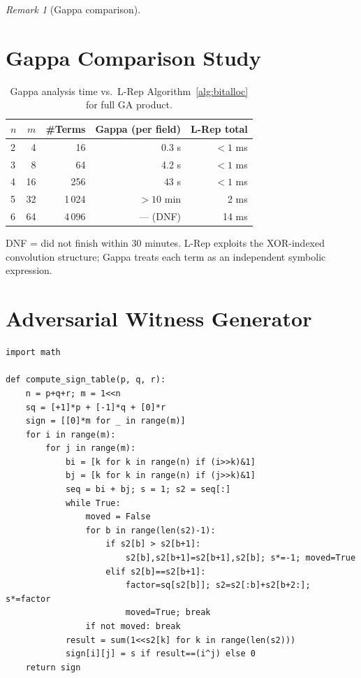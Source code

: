 \documentclass[11pt,a4paper]{article}
\theoremstyle{definition}
\theoremstyle{plain}
\theoremstyle{remark}
\newtheorem{remark}{Remark}[section]
\begin{document}
\begin{remark}[Gappa comparison]
\section{Gappa Comparison Study}
\label{app:gappa-comparison}

\begin{table}[h]
\centering
\caption{Gappa analysis time vs.\ L-Rep Algorithm~\ref{alg:bitalloc} for full GA product.}
\label{tab:gappa}
\begin{tabular}{lrrrr}
\toprule
$n$ & $m$ & \#Terms & Gappa (per field) & L-Rep total \\
\midrule
2 & 4 & 16 & 0.3 s & $<1$ ms \\
3 & 8 & 64 & 4.2 s & $<1$ ms \\
4 & 16 & 256 & 43 s & $<1$ ms \\
5 & 32 & 1\,024 & $>10$ min & 2 ms \\
6 & 64 & 4\,096 & --- (DNF) & 14 ms \\
\bottomrule
\end{tabular}
\par\smallskip
\footnotesize DNF = did not finish within 30 minutes.
L-Rep exploits the XOR-indexed convolution structure;
Gappa treats each term as an independent symbolic expression.
\end{table}

\section{Adversarial Witness Generator}
\label{app:proof}

\begin{lstlisting}[caption={Python adversarial witness generator (proves Theorem 3 tightness)},
  label=lst:witness]
import math

def compute_sign_table(p, q, r):
    n = p+q+r; m = 1<<n
    sq = [+1]*p + [-1]*q + [0]*r
    sign = [[0]*m for _ in range(m)]
    for i in range(m):
        for j in range(m):
            bi = [k for k in range(n) if (i>>k)&1]
            bj = [k for k in range(n) if (j>>k)&1]
            seq = bi + bj; s = 1; s2 = seq[:]
            while True:
                moved = False
                for b in range(len(s2)-1):
                    if s2[b] > s2[b+1]:
                        s2[b],s2[b+1]=s2[b+1],s2[b]; s*=-1; moved=True
                    elif s2[b]==s2[b+1]:
                        factor=sq[s2[b]]; s2=s2[:b]+s2[b+2:]; s*=factor
                        moved=True; break
                if not moved: break
            result = sum(1<<s2[k] for k in range(len(s2)))
            sign[i][j] = s if result==(i^j) else 0
    return sign


\end{lstlisting}
\end{remark}
\end{document}
